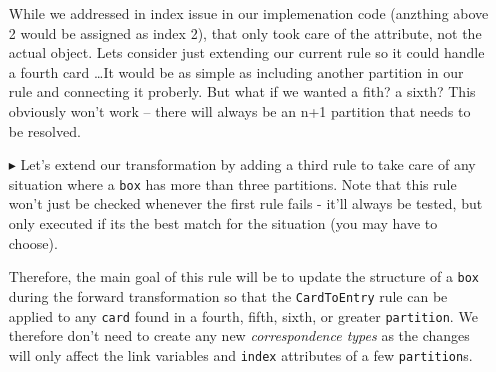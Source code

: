\begin{itemize}
While we addressed in index issue in our implemenation code (anzthing above 2 would be assigned as index 2), that only took care of the attribute, not the
actual object. Lets consider just extending our current rule so it could handle a fourth card \ldots It would be as simple as including
another partition in our rule and connecting it proberly. But what if we wanted a fith? a sixth?  This obviously won't work -- there will always be an n+1
partition that needs to be resolved.

\item[$\blacktriangleright$] Let's extend our transformation by adding a third rule to take care of any situation where a \texttt{box} has more than three
partitions. Note that this rule won't just be checked whenever the first rule fails - it'll always be tested, but only executed if its the best match for the
situation (you may have to choose).

Therefore, the main goal of this rule will be to update the structure of a \texttt{box} during the forward transformation so that the \texttt{CardToEntry} rule
can be applied to any \texttt{card} found in a fourth, fifth, sixth, or greater \texttt{partition}. We therefore don't need to create any new \emph{correspondence
types}  as the changes will only affect the link variables and \texttt{index} attributes of a few \texttt{partition}s.

\end{itemize}







